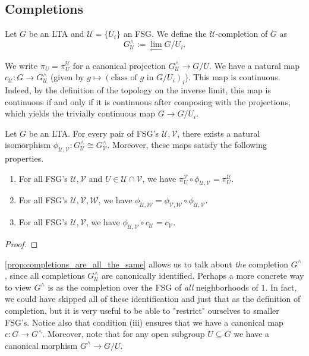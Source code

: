 \subsection{Completions}

\begin{definition} Let $G$ be an LTA and $\mathcal{U} = \{U_i\}$ an FSG. We define the $\mathcal{U}$-completion of $G$ as
\[G_{\mathcal{U}}^\land := \lim_{\leftarrow} G/U_i.\]
\end{definition}

\noindent We write $\pi_U = \pi_U^{\mathcal{U}}$ for a canonical projection $G_{\mathcal{U}}^\land \rightarrow G/U$. We have a natural map $c_\mathcal{U} : G \rightarrow G_\mathcal{U}^\land$ (given by $g \mapsto (\text{class of }g\text{ in } G/U_i)_i$). This map is continuous. Indeed, by the definition of the topology on the inverse limit, this map is continuous if and only if it is continuous after composing with the projections, which yields the trivially continuous map $G \rightarrow G/U_i$.

\begin{proposition}\label{prop:completions_are_all_the_same} Let $G$ be an LTA. For every pair of FSG's $\mathcal{U}, \mathcal{V}$, there exists a natural isomorphism $\phi_{\mathcal{U}, \mathcal{V}} : G_\mathcal{U}^\land \cong G_\mathcal{V}^\land$. Moreover, these maps satisfy the following properties.
\begin{enumerate}
\item[(i)] For all FSG's $\mathcal{U}, \mathcal{V}$ and $U \in \mathcal{U} \cap \mathcal{V}$, we have $\pi_{U}^{\mathcal{V}} \circ \phi_{\mathcal{U}, \mathcal{V}} = \pi_U^\mathcal{U}$.
\item[(ii)] For all FSG's $\mathcal{U}, \mathcal{V}, \mathcal{W}$, we have $\phi_{\mathcal{U}, \mathcal{W}} = \phi_{\mathcal{V}, \mathcal{W}} \circ \phi_{\mathcal{U}, \mathcal{V}}$.
\item[(iii)] For all FSG's $\mathcal{U}, \mathcal{V}$, we have $\phi_{\mathcal{U}, \mathcal{V}} \circ c_\mathcal{U} = c_{\mathcal{V}}$.
\end{enumerate}
\end{proposition}
\begin{proof} \TODO
\end{proof}

\noindent \cref{prop:completions_are_all_the_same} allows us to talk about \emph{the} completion $G^\land$, since all completions $G_{\mathcal{U}}^\land$ are canonically identified. Perhaps a more concrete way to view $G^\land$ is as the completion over the FSG of \emph{all} neighborhoods of $1$. In fact, we could have skipped all of these identification and just that as the definition of completion, but it is very useful to be able to "restrict" ourselves to smaller FSG's. Notice also that condition (iii) ensures that we have a canonical map $c : G \rightarrow G^\land$. Moreover, note that for any open subgroup $U \subseteq G$ we have a canonical morphism $G^\land \rightarrow G/U$.

